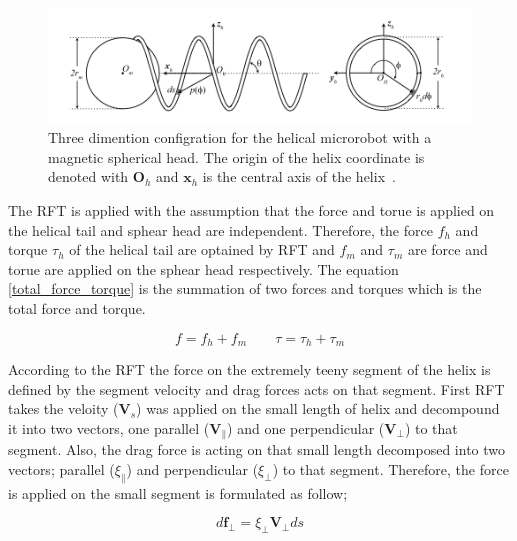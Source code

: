 \documentclass[12pt,a4paper,titlepage]{report}
\begin{document}
\begin{figure}
  \centering
    \includegraphics[width=1.0\textwidth]{RFT-6dof}
  \caption{Three dimention configration for the helical microrobot with a magnetic spherical head. The origin
of the helix coordinate is denoted with $\bm{O}_h$ and $\bm{x}_{h}$ is the central axis of the
 helix~\citep{mahoney2011velocity}.}
  \label{RFT-6dof}
\end{figure}

The \ac*{RFT} is applied with the assumption that the force and torue is applied on the helical tail and sphear
head are independent. Therefore, the force $f_h$ and torque $\tau_h$ of the helical tail are optained by \ac*{RFT} 
and $f_m$ and $\tau_m$ are force and torue are applied on the sphear head respectively. 
The equation \ref{total_force_torque} is the summation of two forces and torques which is the total force and torque. 

\begin{equation}
 f = f_h + f_m \qquad  \tau = \tau_h + \tau_m
\label{total_force_torque}
\end{equation}

According to the \ac*{RFT} the force on the extremely teeny segment of the helix is defined by 
the segment velocity and drag forces acts on that segment. First \ac*{RFT} takes the
 veloity ($\bm{V}_s$) was applied on the small length
of helix and decompound it into two vectors, one parallel ($\bm{V}_{\parallel}$) and one perpendicular ($\bm{V}_{\perp}$)
 to that segment. Also, the drag force is acting on that small length decomposed into two 
vectors; parallel (${\xi}_{\parallel}$) and perpendicular (${\xi}_{\perp}$) to that segment.  
Therefore, the force is applied on the small segment is formulated as follow; 

\begin{equation}
 d{\bm{f}_{\perp}} = {\xi}_{\perp}{\bm{V}_{\perp}}ds 
\label{relation-force_drag}
\end{equation}
\end{document}
